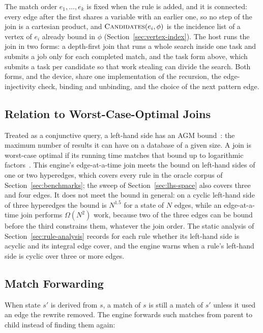The match order $e_1, \ldots, e_k$ is fixed when the rule is added, and it is connected: every edge
after the first shares a variable with an earlier one, so no step of the join is a cartesian
product, and $\textsc{Candidates}(e_i, \phi)$ is the incidence list of a vertex of $e_i$ already
bound in $\phi$ (Section~\ref{sec:vertex-index}). The host runs the join in two forms: a depth-first join that runs a whole search inside one task
and submits a job only for each completed match, and the task form above, which submits a task per
candidate so that work stealing can divide the search. Both forms, and the device, share one
implementation of the recursion, the edge-injectivity check, binding and unbinding, and the choice
of the next pattern edge.

\subsection{Relation to Worst-Case-Optimal Joins}
\label{sec:agm}

Treated as a conjunctive query, a left-hand side has an AGM bound~\cite{atserias2013size}: the
maximum number of results it can have on a database of a given size. A join is worst-case optimal
if its running time matches that bound up to logarithmic factors~\cite{ngo2018worst}. This engine's
edge-at-a-time join meets the bound on left-hand sides of one or two hyperedges, which covers every
rule in the oracle corpus of Section~\ref{sec:benchmarks}; the sweep of Section~\ref{sec:lhs-space}
also covers three and four edges. It does not meet the bound in general: on a cyclic left-hand side
of three hyperedges the bound is $N^{1.5}$ for a state of $N$ edges, while an edge-at-a-time join
performs $\Omega(N^2)$ work, because two of the three edges can be bound before the third
constrains them, whatever the join order. The static analysis of Section~\ref{sec:rule-analysis}
records for each rule whether its left-hand side is acyclic and its integral edge cover, and the
engine warns when a rule's left-hand side is cyclic over three or more edges.

\subsection{Match Forwarding}
\label{sec:forwarding}

When state $s'$ is derived from $s$, a match of $s$ is still a match of $s'$ unless it used an edge
the rewrite removed. The engine forwards such matches from parent to child instead of finding them
again:

